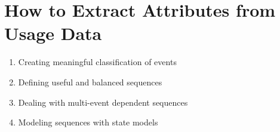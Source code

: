 \section{ How to Extract Attributes from Usage Data}


  \begin{enumerate}
  \item Creating meaningful classification of events
  \item Defining useful and balanced sequences %
  \item Dealing with multi-event dependent sequences
  \item  Modeling sequences with state models %
  \end{enumerate}